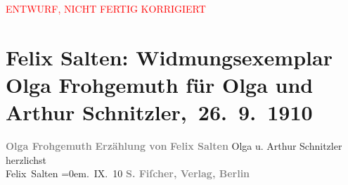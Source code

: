 
\begin{center}
            \textcolor{red}{ENTWURF, NICHT FERTIG KORRIGIERT}
                      \end{center}
            
         
         \renewcommand{\erwaehntePersonen}{Personen: Felix Salten, Olga Schnitzler}
         \renewcommand{\erwaehnteInstitutionen}{Institutionen: S. Fischer Verlag}
         \renewcommand{\erwaehnteOrte}{Orte: Berlin, Wien}
         \renewcommand{\erwaehnteWerke}{Werke: Olga Frohgemuth. Erzählung}
               \section[ Felix Salten: Widmungsexemplar Olga Frohgemuth für Olga und Arthur Schnitzler, 26. 9. 1910]{ Felix Salten: Widmungsexemplar Olga Frohgemuth für Olga und Arthur
               Schnitzler, 26. 9. 1910}\nopagebreak{}\rehead{ }\begin{ledgroupsized}[t]{13cm}\normalsize\beginnumbering \toendnotes[C]{\smallbreak\pagebreak[2]} 
\pstart
           \noindent{}\centering{}{\pb}\textcolor{gray}{\textbf{Olga Frohgemuth}}\pend
           \pstart
           \noindent{}\centering{}\textcolor{gray}{\textbf{Erzählung von}}\pend
           \pstart
           \noindent{}\centering{}\textcolor{gray}{\textbf{Felix Salten}}\pend
           {\bigskip}\pstart
           \noindent{}Olga u. Arthur Schnitzler\pend
           \pstart
           herzlichst{\\[\baselineskip]}\spacefill\mbox{Felix Salten}\pend
           \leftskip=0em{}. IX. 10\pend
           {\bigskip}\pstart
           \noindent{}\centering{}\textcolor{gray}{\textbf{S. Fiſcher, Verlag, Berlin}}\pend
           
         
         \endnumbering{}\end{ledgroupsized}  \newcommand{\dateiname}{L03047}\newcommand{\titel}{Felix Salten: Widmungsexemplar Olga Frohgemuth für Olga und Arthur Schnitzler, 26. 9. 1910}\newcommand{\editorInnen}{Martin Anton Müller und Laura Untner}
      